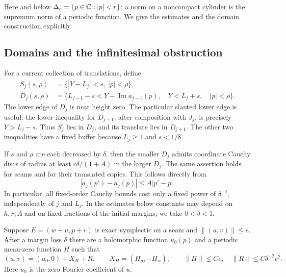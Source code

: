 Here and below $\Delta_r=\{p\in\mathbb C:|p|<r\}$; a norm on a noncompact
cylinder is the supremum norm of a periodic function.  We give the
estimates and the domain construction explicitly.

\subsection{Domains and the infinitesimal obstruction}

For a current collection of translations, define
\[
\begin{split}
 S_j(s,\rho)&=\{|Y-L_j|<s,\ |p|<\rho\},\\
 D_j(s,\rho)&=\{L_{j-1}-s<Y-\operatorname{Im}a_{j-1}(p),\quad
                         Y<L_j+s,\quad |p|<\rho\}.
\end{split}
\]
The lower edge of $D_j$ is near height zero.  The particular slanted
lower edge is useful: the lower inequality for $D_{j+1}$, after
composition with $J_j$, is precisely $Y>L_j-s$.  Thus $S_j$ lies in
$D_j$, and its translate lies in $D_{j+1}$.  The other two inequalities
have a fixed buffer because $L_j\geq1$ and $s<1/8$.

If $s$ and $\rho$ are each decreased by $\delta$, then the smaller
$D_j$ admits coordinate Cauchy discs of radius at least
$c\delta/(1+A)$ in the larger $D_j$.  The same assertion holds for
seams and for their translated copies.  This follows directly from
\[
 |a_j(p')-a_j(p)|\leq A|p'-p|.
\]
In particular, all fixed-order Cauchy bounds cost only a fixed power
of $\delta^{-1}$, independently of $j$ and $L_j$.  In the estimates
below constants may depend on $h,r,A$ and on fixed fractions of the
initial margins; we take $0<\delta<1$.

\begin{lemma}\label{sew:linearize}
Suppose $E=(w+u,p+v)$ is exact symplectic on a seam and
$\|(u,v)\|\leq e$.  After a margin loss $\delta$ there are a
holomorphic function $u_0(p)$ and a periodic mean-zero function $H$
such that
\[
 (u,v)=(u_0,0)+X_H+R,\qquad
 X_H=(H_p,-H_w),\qquad
 \|H\|\leq Ce,\quad \|R\|\leq C\delta^{-2}e^2.
\]
Here $u_0$ is the zero Fourier coefficient of $u$.
\end{lemma}

